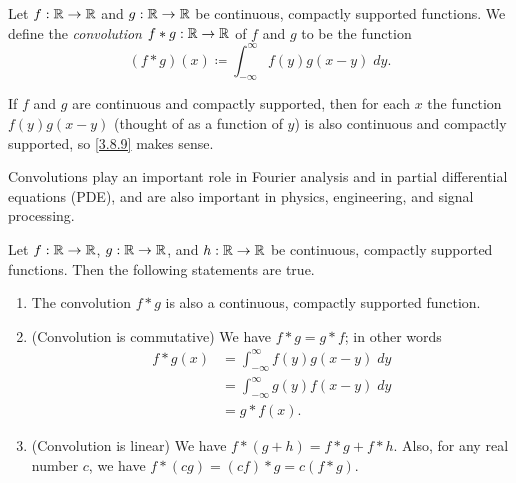 \begin{defn}[Convolution]\label{3.8.9}
  Let \(f : \mathbb{R} \to \mathbb{R}\) and \(g : \mathbb{R} \to \mathbb{R}\) be continuous, compactly supported functions.
  We define the \emph{convolution} \(f * g : \mathbb{R} \to \mathbb{R}\) of \(f\) and \(g\) to be the function
  \[
    (f * g)(x) \coloneqq \int_{-\infty}^\infty f(y) g(x - y) \; dy.
  \]
\end{defn}

\begin{note}
  If \(f\) and \(g\) are continuous and compactly supported, then for each \(x\) the function \(f(y) g(x - y)\) (thought of as a function of \(y\)) is also continuous and compactly supported, so \cref{3.8.9} makes sense.
\end{note}

\begin{rmk}\label{3.8.10}
  Convolutions play an important role in Fourier analysis and in partial differential equations (PDE), and are also important in physics, engineering, and signal processing.
\end{rmk}

\begin{prop}\label{3.8.11}
  Let \(f : \mathbb{R} \to \mathbb{R}\), \(g : \mathbb{R} \to \mathbb{R}\), and \(h : \mathbb{R} \to \mathbb{R}\) be continuous, compactly supported functions.
  Then the following statements are true.
  \begin{enumerate}
    \item The convolution \(f * g\) is also a continuous, compactly supported function.
    \item (Convolution is commutative)
          We have \(f * g = g * f\);
          in other words
          \begin{align*}
            f * g(x) & = \int_{-\infty}^\infty f(y) g(x - y) \; dy \\
                     & = \int_{-\infty}^\infty g(y) f(x - y) \; dy \\
                     & = g * f(x).
          \end{align*}
    \item (Convolution is linear)
          We have \(f * (g + h) = f * g + f * h\).
          Also, for any real number \(c\), we have \(f * (cg) = (cf) * g = c(f * g)\).
  \end{enumerate}
\end{prop}

